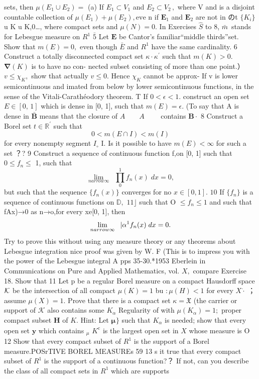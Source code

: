 sets, then $\mu(E_{1}\cup E_{2})=$ (a) If $E_{1}\subset V_{1}$ and $E_{2}\subset V_{2}\,,$ where V and is a disjoint countable collection of $\mu(E_{1})+\mu(E_{2}),\mathrm{eve}$ n if ${\boldsymbol{E}}_{1}$ and ${\boldsymbol{E}}_{2}$ are not in のt $\{K_{i}\}$ u K u K,0…, where compact sets and $\mu(N)=0.$ In Exercises $\scriptstyle{\hat{S}}$ to 8, ${\bar{m}}\,$ stands for Lebesgue measure on $R^{1}$ $\scriptstyle{\bar{5}}$ Let $\boldsymbol{E}$ be Cantor's familiar“middle thirds”set. Show that $m(E)=0,$ even though $\bar{E}$ and $R^{1}$ have the same cardinality. 6 Construct a totally disconnected compact set $\scriptstyle{\kappa\cdot{\kappa}^{\prime}}$ such that $m(K)>0.$ $\mathbf{\nabla}(K)$ is to have no con- nected subset consisting of more than one point.） $v\leq\chi_{K},$ show that actually $v\leq0.$ Hence $\chi_{\scriptscriptstyle K}$ cannot be approx- If v is lower semicontinuous and imated from below by lower semicontinuous functions, in the sense of the Vitali-Carathéodory theorem. T If $0<\epsilon<1.$ construct an open set $\scriptstyle E\in[0,\,1]$ which is dense in [0, 1], such that $m(E)=\epsilon.$ (To say that A is dense in $\bar{\boldsymbol{B}}$ means that the closure of $\scriptstyle A\quad\quad A\quad\quad$ contains ${\boldsymbol{B}}\cdot$ 8 Construct a Borel set $\scriptstyle t\in\mathbb{R}^{\prime}$ such that $$ 0<m(E\cap I)<m(I) $$ for every nonempty segment $\scriptstyle{I_{\circ}}$ I. Is it possible to have $m(E)<\infty$ for such a set ？? 9 Construct a sequence of continuous function f,on [0, 1] such that $0\leq f_{n}\leq$ 1, such that $$ \operatorname*{lim}_{n arrow\infty}\ \;\prod_{0}^{1}f_{n}(x)\;d x=0, $$ but such that the sequence $\{f_{n}(x)\}$ converges for no $x\in[0,1].$ $10$ If $\{f_{n}\}$ is a sequence of continuous functions on $\mathbb{D},$ $1\!\!\!\!1\!\!\!\rfloor$ such that O $\leq f_{n}\leq1$ and such that fAx)→0 as n→o,for every xe[0, 1], then $$ \operatorname*{lim}_{n arrow\infty}\ \; \vert{\bf{\alpha}}^{1}f_{n}(x)\;d x=0. $$ Try to prove this without using any measure theory or any theorems about Lebesgue integration nice proof was given by W. F (This is to impress you with the power of the Lebesgue integral $\mathrm{A}$ pps 35-30.*1953 Eberlein in Communications on Pure and Applied Mathematics, vol. $\scriptstyle X,$ compare Exercise 18. Show that 11 Let p be a regular Borel measure on a compact Hausdorff space ${\cal K}$ be the intersection of all compact $\mu(K)=1$ bu $\textstyle:\mu(H)<1$ for every $X{\dot{\cdot}}$ ； assume $\mu(X)=1.$ Prove that there is a compact set $\kappa={\mathfrak{X}}$ (the carrier or support of $\scriptstyle{\mathcal{K}}$ also contains some $K_{\alpha}$ Regularity of with $\mu(K_{\alpha})=1;$ proper compact subset $\boldsymbol{H}$ of $K.$ Hint: Let ${\boldsymbol{\mu}}_{}^{}\}$ such that $\textstyle K_{\alpha}$ is needed; show that every open set ${\boldsymbol{y}}$ which contains ${}_{\mu}$ $K^{\mathrm{c}}$ is the largest open set in $\textstyle X$ whose measure is O 12 Show that every compact subset of $R^{1}$ is the support of a Borel measure.POSrTIVE BOREL MEASUREs 59 13 s it true that every compact subset of $R^{1}$ is the support of a continuous function?？ If not, can you describe the class of all compact sets in $R^{1}$ which are supports 